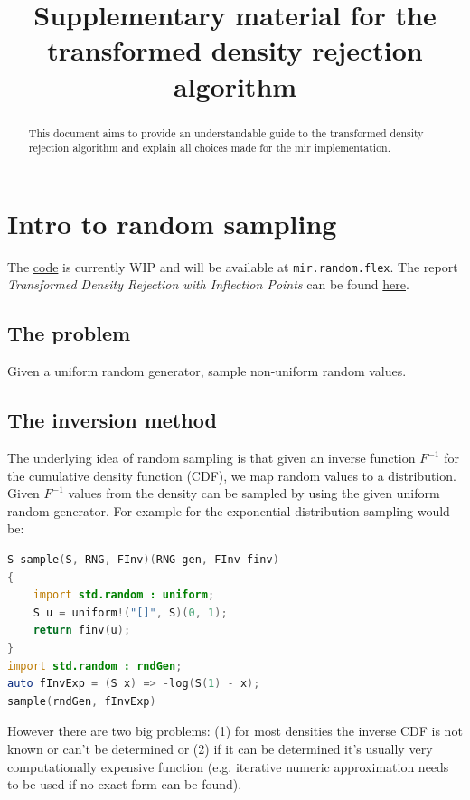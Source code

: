\documentclass[]{article}
\title{Supplementary material for the transformed density rejection algorithm}
\author{}
\begin{document}
\maketitle

\begin{abstract}
This document aims to provide an understandable guide to the transformed density rejection algorithm and explain all choices made for the mir implementation.
\end{abstract}

\section{Intro to random sampling}

The \href{https://github.com/libmir/mir/pull/240}{code} is currently WIP and will be available at \texttt{mir.random.flex}. The report \textit{Transformed Density Rejection with Inflection Points} can be found  \href{http://epub.wu.ac.at/3158/1/techreport-110.pdf}{here}.

\subsection{The problem}

Given a uniform random generator, sample non-uniform random values.

\subsection{The inversion method}

The underlying idea of random sampling is that given an inverse function $F^{-1}$ for the cumulative density function (CDF), we map random values to a distribution. Given $F^{-1}$ values from the density can be sampled by using the given uniform random generator.
For example for the exponential distribution sampling would be:

\begin{lstlisting}[language=D]
S sample(S, RNG, FInv)(RNG gen, FInv finv)
{
    import std.random : uniform;
    S u = uniform!("[]", S)(0, 1);
    return finv(u);
}
import std.random : rndGen;
auto fInvExp = (S x) => -log(S(1) - x);
sample(rndGen, fInvExp)
\end{lstlisting}

However there are two big problems: (1) for most densities the inverse CDF is not known or can't be determined or (2) if it can be determined it's usually very computationally expensive function (e.g. iterative numeric approximation needs to be used if no exact form can be found).
\end{document}
